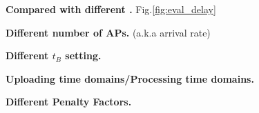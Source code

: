 \textbf{Compared with different \brlatency.} Fig.\ref{fig:eval_delay}
\blindtext

\textbf{Different number of APs.} (a.k.a arrival rate)
\blindtext

\textbf{Different $t_B$ setting.}
\blindtext

\textbf{Uploading time domains/Processing time domains.}
\blindtext

\textbf{Different Penalty Factors.}
\blindtext
